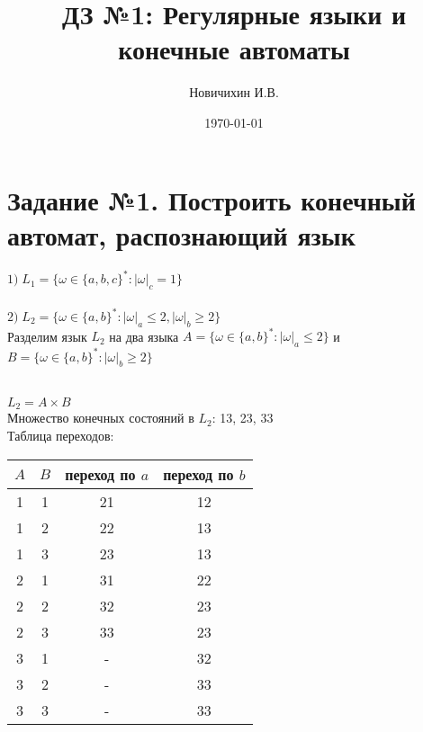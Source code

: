 \documentclass[a4paper,12pt]{article}
\author{Новичихин И.В.}
\title{ДЗ №1: Регулярные языки и конечные автоматы}
\date{\today}
\begin{document}
\maketitle
\newpage


\section{Задание №1. Построить конечный автомат, распознающий язык}

$ 1) \; L_1=\{\omega\in\{a,b,c\}^* : |\omega|_c = 1 \} $ \\

 \\




$ 2) \; L_2=\{\omega\in\{a,b\}^* : |\omega|_a \leqslant 2, |\omega|_b \geqslant 2 \} $ \\

Разделим язык $L_2$ на два языка 
$A=\{\omega\in\{a,b\}^* : |\omega|_a \leqslant 2 \} $ и $B=\{\omega\in\{a,b\}^* : |\omega|_b \geqslant 2 \} $

\\


$L_2=A \times B$\\ 
Множество конечных состояний в $L_2$: 13, 23, 33\\
Таблица переходов:
\begin{center}
    \begin{tabular}{ |c|c|c|c| } 
        \hline
        $A$ & $B$ & переход по $a$ & переход по $b$ \\
        \hline
        1 & 1 & 21 & 12 \\
        \hline
        1 & 2 & 22 & 13 \\
        \hline
        1 & 3 & 23 & 13 \\
        \hline
        2 & 1 & 31 & 22 \\
        \hline
        2 & 2 & 32 & 23 \\
        \hline
        2 & 3 & 33 & 23 \\
        \hline
        3 & 1 & - & 32 \\
        \hline
        3 & 2 & - & 33 \\
        \hline
        3 & 3 & - & 33 \\
        \hline
    \end{tabular}
\end{center}
\end{document}
